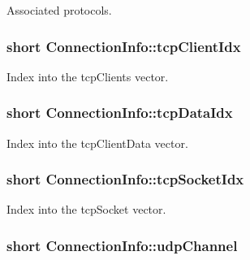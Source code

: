 Associated protocols. 

\hypertarget{structConnectionInfo_ae70551f232fc576d4f52e0c610c5d62c}{
\subsubsection[{tcp\-Client\-Idx}]{\setlength{\rightskip}{0pt plus 5cm}short Connection\-Info\-::tcp\-Client\-Idx}}\label{structConnectionInfo_ae70551f232fc576d4f52e0c610c5d62c}


Index into the tcp\-Clients vector. 

\hypertarget{structConnectionInfo_ae74bd85133eb1b4c3cec7431c280fa13}{
\subsubsection[{tcp\-Data\-Idx}]{\setlength{\rightskip}{0pt plus 5cm}short Connection\-Info\-::tcp\-Data\-Idx}}\label{structConnectionInfo_ae74bd85133eb1b4c3cec7431c280fa13}


Index into the tcp\-Client\-Data vector. 

\hypertarget{structConnectionInfo_a1e837b6519e7035ad689232289931e82}{
\subsubsection[{tcp\-Socket\-Idx}]{\setlength{\rightskip}{0pt plus 5cm}short Connection\-Info\-::tcp\-Socket\-Idx}}\label{structConnectionInfo_a1e837b6519e7035ad689232289931e82}


Index into the tcp\-Socket vector. 

\hypertarget{structConnectionInfo_a04b5d2e6b358b6b9337b75dbeb01197e}{
\subsubsection[{udp\-Channel}]{\setlength{\rightskip}{0pt plus 5cm}short Connection\-Info\-::udp\-Channel}}\label{structConnectionInfo_a04b5d2e6b358b6b9337b75dbeb01197e}


